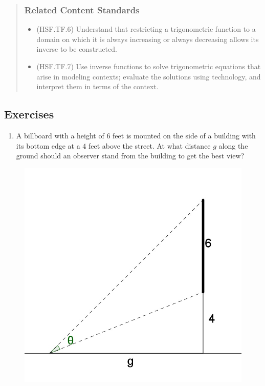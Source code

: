 \documentclass[
]{book}
\providecommand{\tightlist}{%
  \setlength{\itemsep}{0pt}\setlength{\parskip}{0pt}}
\theoremstyle{definition}
\theoremstyle{definition}
\theoremstyle{definition}
\theoremstyle{remark}
\begin{document}
\begin{quote}
\hypertarget{related-content-standards-61}{%
\subsubsection*{Related Content Standards}\label{related-content-standards-61}}

\begin{itemize}
\tightlist
\item
  (HSF.TF.6) Understand that restricting a trigonometric function to a domain on which it is always increasing or always decreasing allows its inverse to be constructed.
\item
  (HSF.TF.7) Use inverse functions to solve trigonometric equations that arise in modeling contexts; evaluate the solutions using technology, and interpret them in terms of the context.
\end{itemize}
\end{quote}

\hypertarget{exercises-34}{%
\subsection{Exercises}\label{exercises-34}}

\begin{enumerate}
\def\labelenumi{\arabic{enumi}.}
\tightlist
\item
  A billboard with a height of \(6\) feet is mounted on the side of a building with its bottom edge at a \(4\) feet above the street. At what distance \(g\) along the ground should an observer stand from the building to get the best view?
\end{enumerate}

\begin{figure}

{\centering \includegraphics[width=0.3\linewidth]{images/billboard} 

}

\end{figure}
\end{document}
